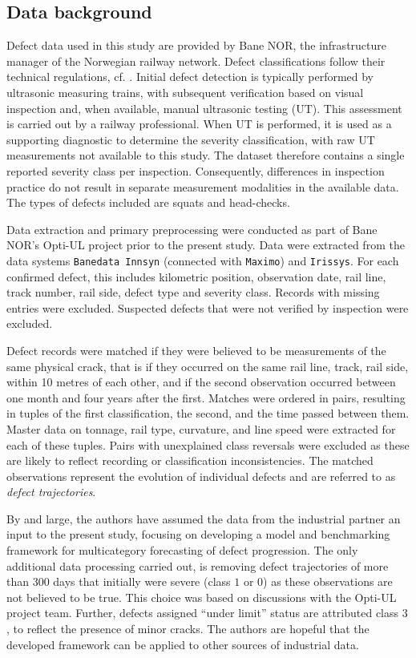 \documentclass{article}
\begin{document}
 \subsection{Data background} \label{sec:data_background}
Defect data used in this study are provided by Bane NOR, the infrastructure manager of the Norwegian railway network. Defect classifications follow their technical regulations, cf. \citet{banenor_technical_regulations}.
Initial defect detection is typically performed by ultrasonic measuring trains, with subsequent verification based on visual inspection and, when available, manual ultrasonic testing (UT). This assessment is carried out by a railway professional.
When UT is performed, it is used as a supporting diagnostic to determine the severity classification, with raw UT measurements not available to this study. The dataset therefore contains a single reported severity class per inspection. Consequently, differences in inspection practice do not result in separate measurement modalities in the available data. The types of defects included are squats and head-checks.

Data extraction and primary preprocessing were conducted as part of Bane NOR's Opti-UL project prior to the present study. Data were extracted from the data systems \texttt{Banedata Innsyn} (connected with \texttt{Maximo}) and \texttt{Irissys}. For each confirmed defect, this includes kilometric position, observation date, rail line, track number, rail side, defect type and severity class. Records with missing entries were excluded. Suspected defects that were not verified by inspection were excluded.

Defect records were matched if they were believed to be measurements of the same physical crack, that is if they occurred on the same rail line, track, rail side, within 10 metres of each other, and if the second observation occurred between one month and four years after the first. Matches were ordered in pairs, resulting in tuples of the first classification, the second, and the time passed between them. Master data on tonnage, rail type, curvature, and line speed were extracted for each of these tuples. Pairs with unexplained class reversals were excluded as these are likely to reflect recording or classification inconsistencies. The matched observations represent the evolution of individual defects and are referred to as \textit{defect trajectories}.


By and large, the authors have assumed the data from the industrial partner an input to the present study, focusing on developing a model and benchmarking framework for multicategory forecasting of defect progression. The only additional data processing carried out, is removing defect trajectories of more than 300 days that initially were severe (class $1$ or $0$) as these observations are not believed to be true. This choice was based on discussions with the Opti-UL project team. Further, defects assigned ``under limit'' status are attributed class $3$, to reflect the presence of minor cracks.
The authors are hopeful that the developed framework can be applied to other sources of industrial data.
\end{document}
